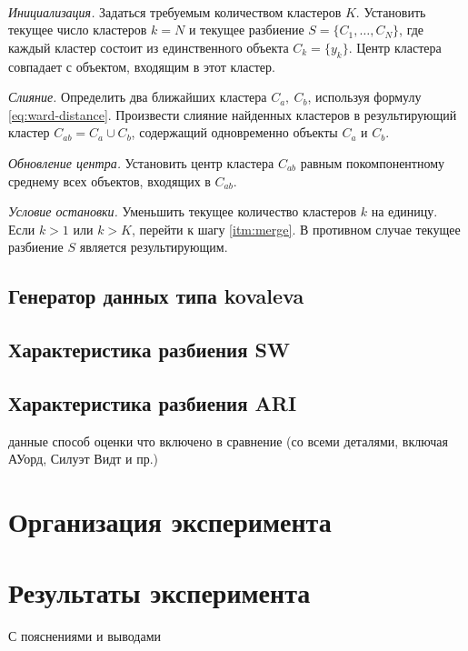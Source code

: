 \documentclass[12pt]{a&t}
\begin{document}
\begin{algorithm}[(Ward)] \label{alg:experiment}
	\
	\begin{enumlist}[.] 
		\item \textit{Инициализация.}
		Задаться требуемым количеством кластеров $ K $. Установить текущее число кластеров $ k=N $ и текущее разбиение $ S=\{C_1,\ldots,C_N\} $, где каждый кластер состоит из единственного объекта $ C_k=\{y_k\} $. Центр кластера совпадает с объектом, входящим в этот кластер.
		\item \label{itm:merge}\textit{Слияние.}
		Определить два ближайших кластера $ C_a,\:C_b $, используя формулу \ref{eq:ward-distance}. Произвести слияние найденных кластеров в результирующий кластер $ C_{ab} = C_a \cup C_b $, содержащий одновременно объекты  $ C_a $ и $ C_b $.
		\item \textit{Обновление центра.}
		Установить центр кластера $ C_{ab} $ равным покомпонентному среднему всех объектов, входящих в $ C_{ab} $.
		\item \textit{Условие остановки.}
		Уменьшить текущее количество кластеров $ k $ на единицу. Если $ k>1 $ или $ k>K $, перейти к шагу \ref{itm:merge}. В противном случае текущее разбиение $ S $ является результирующим.
	\end{enumlist}
\end{algorithm}


\newpage
\subsection{Генератор данных типа kovaleva}\label{sec:data-generation}
\subsection{Характеристика разбиения SW}\label{sec:sw}
\subsection{Характеристика разбиения ARI}\label{sec:ari}

данные 
способ оценки
что включено в сравнение
(со всеми деталями, включая АУорд, Силуэт Видт и пр.)


\section{Организация эксперимента}

\section{Результаты эксперимента}
С пояснениями и выводами
\end{document}

